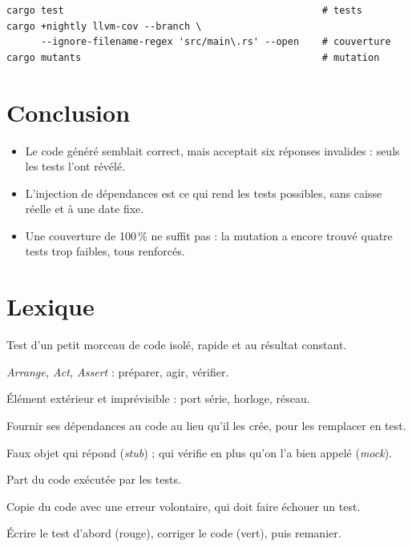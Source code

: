 \documentclass[11pt,a4paper]{article}
\begin{document}
\noindent\begin{minipage}{\linewidth}
\begin{verbatim}
cargo test                                             # tests
cargo +nightly llvm-cov --branch \
      --ignore-filename-regex 'src/main\.rs' --open    # couverture
cargo mutants                                          # mutation
\end{verbatim}
\end{minipage}

\section{Conclusion}

\begin{itemize}
  \item Le code généré semblait correct, mais acceptait six réponses invalides : seuls les
        tests l'ont révélé.
  \item L'injection de dépendances est ce qui rend les tests possibles, sans caisse réelle et
        à une date fixe.
  \item Une couverture de 100\,\% ne suffit pas : la mutation a encore trouvé quatre tests trop
        faibles, tous renforcés.
\end{itemize}

\appendix
\section{Lexique}

\begin{description}[leftmargin=2.9cm, labelwidth=2.7cm, style=sameline, itemsep=1pt]
  \item[Test unitaire] Test d'un petit morceau de code isolé, rapide et au résultat constant.
  \item[AAA] \emph{Arrange, Act, Assert} : préparer, agir, vérifier.
  \item[Dépendance] Élément extérieur et imprévisible : port série, horloge, réseau.
  \item[Injection] Fournir ses dépendances au code au lieu qu'il les crée, pour les remplacer
        en test.
  \item[Stub, mock] Faux objet qui répond (\emph{stub}) ; qui vérifie en plus qu'on l'a bien
        appelé (\emph{mock}).
  \item[Couverture] Part du code exécutée par les tests.
  \item[Mutant] Copie du code avec une erreur volontaire, qui doit faire échouer un test.
  \item[TDD] Écrire le test d'abord (rouge), corriger le code (vert), puis remanier.
\end{description}
\end{document}
